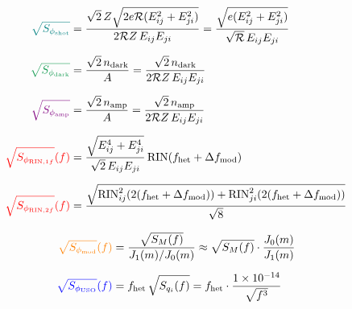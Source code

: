 \documentclass[11pt]{article}
\begin{document}
\begin{align*}
    {\color{teal}\sqrt{S_{\phi_\text{shot}}}}
        &= \frac{\sqrt{2}\,Z\sqrt{2e\mathcal{R}(E_{ij}^2+E_{ji}^2)}}{2\mathcal{R}Z\,E_{ij}E_{ji}}
         = \frac{\sqrt{e(E_{ij}^2+E_{ji}^2)}}{\sqrt{\mathcal{R}}\,E_{ij}E_{ji}}
    \\[6pt]
    {\color{ForestGreen}\sqrt{S_{\phi_\text{dark}}}}
        &= \frac{\sqrt{2}\,n_\text{dark}}{A}
         = \frac{\sqrt{2}\,n_\text{dark}}{2\mathcal{R}Z\,E_{ij}E_{ji}}
    \\[6pt]
    {\color{violet}\sqrt{S_{\phi_\text{amp}}}}
        &= \frac{\sqrt{2}\,n_\text{amp}}{A}
         = \frac{\sqrt{2}\,n_\text{amp}}{2\mathcal{R}Z\,E_{ij}E_{ji}}
    \\[6pt]
    {\color{red}\sqrt{S_{\phi_{\text{RIN},1f}}}(f)}
        &= \frac{\sqrt{E_{ij}^4+E_{ji}^4}}{\sqrt{2}\,E_{ij}E_{ji}}\,
           \text{RIN}(f_\text{het}+\Delta f_\text{mod})
    \\[6pt]
    {\color{red}\sqrt{S_{\phi_{\text{RIN},2f}}}(f)}
        &= \frac{\sqrt{{\text{RIN}}_{ij}^2(2(f_\text{het}+\Delta f_\text{mod}))
                     + {\text{RIN}}_{ji}^2(2(f_\text{het}+\Delta f_\text{mod}))}}{\sqrt{8}}
\end{align*}



\begin{align*}
    {\color{orange}\sqrt{S_{\phi_\text{mod}}}(f)}
        &= \frac{\sqrt{S_M(f)}}{J_1(m)/J_0(m)}
         \approx \sqrt{S_M(f)}\cdot\frac{J_0(m)}{J_1(m)}
    \\[6pt]
    {\color{blue}\sqrt{S_{\phi_\text{USO}}}(f)}
        &= f_\text{het}\,\sqrt{S_{q_i}(f)}
         = f_\text{het}\cdot\frac{1\times10^{-14}}{\sqrt{f^3}}
\end{align*}
\end{document}
